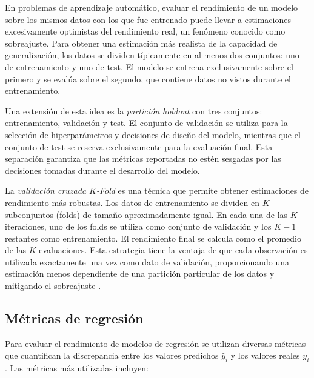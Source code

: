 En problemas de aprendizaje automático, evaluar el rendimiento de un modelo sobre los mismos datos con los que fue entrenado puede llevar a estimaciones excesivamente optimistas del rendimiento real, un fenómeno conocido como sobreajuste. Para obtener una estimación más realista de la capacidad de generalización, los datos se dividen típicamente en al menos dos conjuntos: uno de entrenamiento y uno de test. El modelo se entrena exclusivamente sobre el primero y se evalúa sobre el segundo, que contiene datos no vistos durante el entrenamiento.

Una extensión de esta idea es la \textit{partición holdout} con tres conjuntos: entrenamiento, validación y test. El conjunto de validación se utiliza para la selección de hiperparámetros y decisiones de diseño del modelo, mientras que el conjunto de test se reserva exclusivamente para la evaluación final. Esta separación garantiza que las métricas reportadas no estén sesgadas por las decisiones tomadas durante el desarrollo del modelo.

La \textit{validación cruzada $K$-Fold} es una técnica que permite obtener estimaciones de rendimiento más robustas. Los datos de entrenamiento se dividen en $K$ subconjuntos (folds) de tamaño aproximadamente igual. En cada una de las $K$ iteraciones, uno de los folds se utiliza como conjunto de validación y los $K-1$ restantes como entrenamiento. El rendimiento final se calcula como el promedio de las $K$ evaluaciones. Esta estrategia tiene la ventaja de que cada observación es utilizada exactamente una vez como dato de validación, proporcionando una estimación menos dependiente de una partición particular de los datos y mitigando el sobreajuste \cite{hastie2009elements}.

\subsection{Métricas de regresión}
\label{sec:metricas_regresion}

Para evaluar el rendimiento de modelos de regresión se utilizan diversas métricas que cuantifican la discrepancia entre los valores predichos $\hat{y}_i$ y los valores reales $y_i$. Las métricas más utilizadas incluyen:

